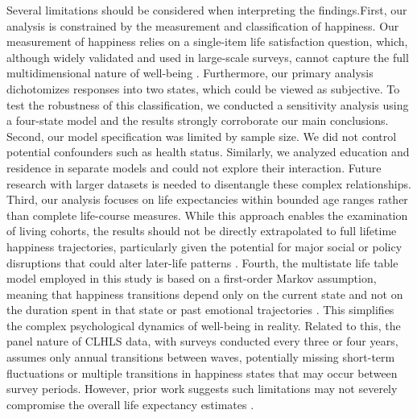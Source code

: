 \documentclass[12pt, a4paper]{article}
\begin{document}
Several limitations should be considered when interpreting the findings.First, our analysis is constrained by the measurement and classification of happiness. Our measurement of happiness relies on a single-item life satisfaction question, which, although widely validated and used in large-scale surveys, cannot capture the full multidimensional nature of well-being \autocite{george.2010.still}. Furthermore, our primary analysis dichotomizes responses into two states, which could be viewed as subjective. To test the robustness of this classification, we conducted a sensitivity analysis using a four-state model and the results strongly corroborate our main conclusions. Second, our model specification was limited by sample size. We did not control potential confounders such as health status. Similarly, we analyzed education and residence in separate models and could not explore their interaction. Future research with larger datasets is needed to disentangle these complex relationships. Third, our analysis focuses on life expectancies within bounded age ranges rather than complete life-course measures. While this approach enables the examination of living cohorts, the results should not be directly extrapolated to full lifetime happiness trajectories, particularly given the potential for major social or policy disruptions that could alter later-life patterns \autocite{payne.2022.expansion}. Fourth, the multistate life table model employed in this study is based on a first-order Markov assumption, meaning that happiness transitions depend only on the current state and not on the duration spent in that state or past emotional trajectories \autocite{payne.2022.expansion,shen.2023.disability}. This simplifies the complex psychological dynamics of well-being in reality. Related to this, the panel nature of CLHLS data, with surveys conducted every three or four years, assumes only annual transitions between waves, potentially missing short-term fluctuations or multiple transitions in happiness states that may occur between survey periods. However, prior work suggests such limitations may not severely compromise the overall life expectancy estimates \autocite{liu.2019.are}.
\end{document}
